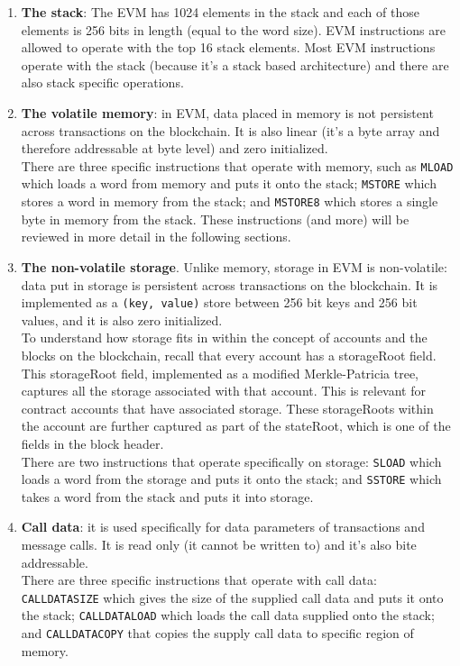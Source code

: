 \begin{enumerate}

    \item\textbf{The stack}: The EVM has 1024 elements in the stack and each of those elements is 256 bits in length (equal to the word size).
    EVM instructions are allowed to operate with the top 16 stack elements.
    Most EVM instructions operate with the stack (because it's a stack based architecture) and there are also stack specific operations.

    \item\textbf{The volatile memory}: in EVM, data placed in memory is not persistent across transactions on the blockchain.
    It is also linear (it's a byte array and therefore addressable at byte level) and zero initialized.\\

    There are three specific instructions that operate with memory, such as \texttt{MLOAD} which loads a word from memory and puts it onto the stack; \texttt{MSTORE} which stores a word in memory from the stack; and \texttt{MSTORE8} which stores a single byte in memory from the stack.
    These instructions (and more) will be reviewed in more detail in the following sections.

    \item\textbf{The non-volatile storage}.
    Unlike memory, storage in EVM is non-volatile: data put in storage is persistent across transactions on the blockchain.
    It is implemented as a \texttt{(key, value)} store between 256 bit keys and 256 bit values, and it is also zero initialized.\\
    
    To understand how storage fits in within the concept of accounts and the blocks on the blockchain, recall that every account has a storageRoot field.
    This storageRoot field, implemented as a modified Merkle-Patricia tree, captures all the storage associated with that account.
    This is relevant for contract accounts that have associated storage.
    These storageRoots within the account are further captured as part of the stateRoot, which is one of the fields in the block header.\\
    
    There are two instructions that operate specifically on storage: \texttt{SLOAD} which loads a word from the storage and puts it onto the stack; and \texttt{SSTORE} which takes a word from the stack and puts it into storage.

    \item\textbf{Call data}: it is used specifically for data parameters of transactions and message calls.
    It is read only (it cannot be written to) and it's also bite addressable.\\
    
    There are three specific instructions that operate with call data: \texttt{CALLDATASIZE} which gives the size of the supplied call data and puts it onto the stack; \texttt{CALLDATALOAD} which loads the call data supplied onto the stack; and \texttt{CALLDATACOPY} that copies the supply call data to specific region of memory.

\end{enumerate}

